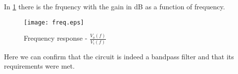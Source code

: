 In \ref{fig:freq_response} there is the frquency with the gain in dB as a function of frequency.


\begin{figure}[H] \centering
\texttt{[image: freq.eps]}
\caption{Frequency response - $\frac{V_o(f)}{V_i(f)}$}
\label{fig:freq_response}
\end{figure}

Here we can confirm that the circuit is indeed a bandpass filter and that its requirements were met. 




